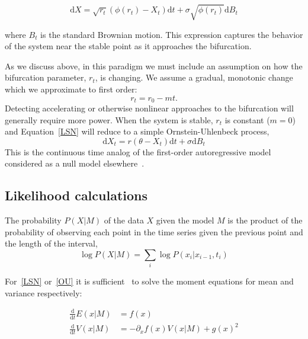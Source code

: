 \documentclass[authoryear,review,11pt]{elsarticle}
\newcommand{\ud}{\mathrm{d}}
\begin{document}
\begin{equation}
\ud X = \sqrt{ r_t } (\phi(r_t) - X_t)\ud t + \sigma\sqrt{\phi(r_t) } \ud B_t \label{LSN}
\end{equation}

where $B_t$ is the standard Brownian motion. 
This expression captures the behavior of the system near the stable point as it approaches the bifurcation.

As we discuss above, in this paradigm we must include an assumption on how the bifurcation parameter, $r_t$, is changing.
We assume a gradual, monotonic change which we approximate to first order:
\begin{equation}
r_t = r_0 - m t.
\label{R_t}
\end{equation}
Detecting accelerating or otherwise nonlinear approaches to the bifurcation will generally require more power.
When the system is stable, $r_t$ is constant ($m=0$) and Equation~\eqref{LSN} will reduce to a simple Ornstein-Uhlenbeck process,
\begin{equation}
\ud X_t = r (\theta - X_t) \ud t + \sigma \ud B_t \label{OU}
\end{equation}
This is the continuous time analog of the first-order autoregressive model considered as a null model elsewhere~\citep[\emph{e.g.}][]{Dakos2008, Guttal2008a}.




\subsection*{Likelihood calculations}
The probability \(P(X|M) \) of the data \(X\) given the model \(M\) is the product of the probability of observing each point in the time series given the previous point and the length of the interval,
\begin{equation}
\log P(X | M)=  \sum_i \log P(x_i | x_{i-1}, t_i)
\end{equation}

For~\eqref{LSN} or~\eqref{OU} it is sufficient~\citep{Gardiner2009} to solve the moment equations for mean and variance respectively:

\begin{align}
 \frac{\ud }{\ud t} E(x| M)&=  f(x) \\
\frac{\ud}{\ud t} V(x| M) &=  -\partial_x f(x) V(x|M) + g(x)^2
  \label{general_moments}
\end{align}
\end{document}
